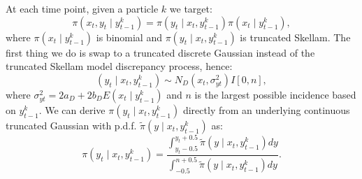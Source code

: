 \documentclass[a4paper]{article}
\begin{document}
At each time point, given a particle $k$ we target:
\begin{equation}
    \pi\left(x_t, y_t \mid y^k_{t - 1}\right) = \pi\left(y_t \mid x_t, y^k_{t - 1}\right)\pi\left(x_t \mid y^k_{t - 1}\right),\label{eq:target}
\end{equation}
where $\pi\left(x_t \mid y^k_{t - 1}\right)$ is binomial and $\pi\left(y_t \mid x_t, y^k_{t - 1}\right)$ is truncated Skellam. The first thing we do is swap to a truncated discrete Gaussian instead of the truncated Skellam model discrepancy process, hence:
\begin{equation}
     \left(y_t \mid x_t, y^k_{t - 1}\right) \sim N_D\left(x_t, \sigma^2_{yt}\right)I\left[0, n\right],
\end{equation}
where $\sigma^2_{yt} = 2 a_D + 2 b_D E\left(x_t \mid y^k_{t - 1}\right)$ and $n$ is the largest possible incidence based on $y^k_{t - 1}$. We can derive $\pi\left(y_t \mid x_t, y^k_{t - 1}\right)$ directly from an underlying continuous truncated Gaussian with p.d.f. $\tilde{\pi}\left(y \mid x_t, y^k_{t - 1}\right)$ as:
\begin{equation}
    \pi\left(y_t \mid x_t, y^k_{t - 1}\right) = \frac{\int_{y_t - 0.5}^{y_t + 0.5} \tilde{\pi}\left(y \mid x_t, y^k_{t - 1}\right) dy}{\int_{-0.5}^{n + 0.5} \tilde{\pi}\left(y \mid x_t, y^k_{t - 1}\right) dy}.
\end{equation}
\end{document}
